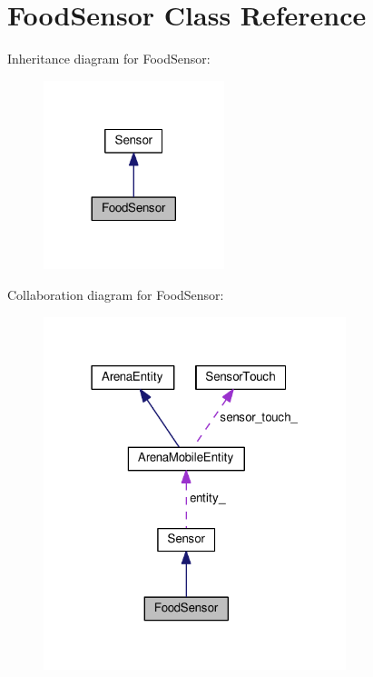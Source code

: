 \hypertarget{classFoodSensor}{}\section{Food\+Sensor Class Reference}
\label{classFoodSensor}


Inheritance diagram for Food\+Sensor\+:\nopagebreak
\begin{figure}[H]
\begin{center}
\leavevmode
\includegraphics[width=149pt]{classFoodSensor__inherit__graph}
\end{center}
\end{figure}


Collaboration diagram for Food\+Sensor\+:\nopagebreak
\begin{figure}[H]
\begin{center}
\leavevmode
\includegraphics[width=250pt]{classFoodSensor__coll__graph}
\end{center}
\end{figure}
